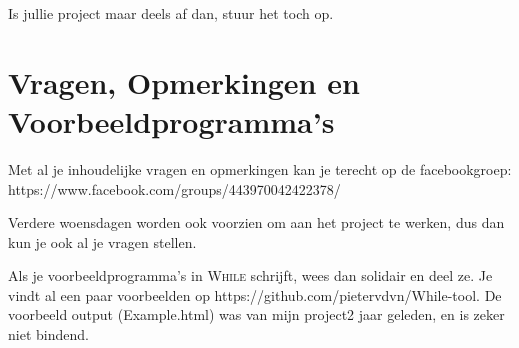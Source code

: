 \documentclass{article}
\begin{document}
Is jullie project maar deels af dan, stuur het toch op.

\section{Vragen, Opmerkingen en Voorbeeldprogramma's}

Met al je inhoudelijke vragen en opmerkingen kan je terecht op de facebookgroep: https://www.facebook.com/groups/443970042422378/

Verdere woensdagen worden ook voorzien om aan het project te werken, dus dan kun je ook al je vragen stellen.

Als je voorbeeldprogramma's in \textsc{While} schrijft, wees dan solidair
en deel ze. Je vindt al een paar voorbeelden op https://github.com/pietervdvn/While-tool. De voorbeeld output (Example.html) was van mijn project2 jaar geleden, en is zeker niet bindend.
\end{document}

